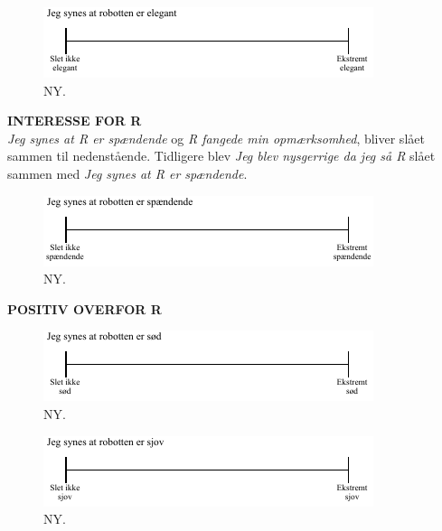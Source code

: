 \noindent
%
%
\begin{figure}[H]
\centering
\includegraphics[width =\textwidth]{Figure/UdvalgteSkalaer/ElegantR} 
\caption{NY.}
\label{fig:SkalaElegantR}
\end{figure}
\noindent
%
\textbf{INTERESSE FOR R}\\
\textit{Jeg synes at R er spændende} og \textit{R fangede min opmærksomhed}, bliver slået sammen til nedenstående. Tidligere blev \textit{Jeg blev nysgerrige da jeg så R} slået sammen med \textit{Jeg synes at R er spændende}.
%
\begin{figure}[H]
\centering
\includegraphics[width =\textwidth]{Figure/UdvalgteSkalaer/RerSpaendende} 
\caption{NY.}
\label{fig:SkalaRerSpaendende}
\end{figure}
\noindent
%
\textbf{POSITIV OVERFOR R}\\
%
\begin{figure}[H]
\centering
\includegraphics[width =\textwidth]{Figure/UdvalgteSkalaer/SoedR} 
\caption{NY.}
\label{fig:SkalaSoedR}
\end{figure}
\noindent
%
%
\begin{figure}[H]
\centering
\includegraphics[width =\textwidth]{Figure/UdvalgteSkalaer/SjovR} 
\caption{NY.}
\label{fig:SkalaSjovR}
\end{figure}
